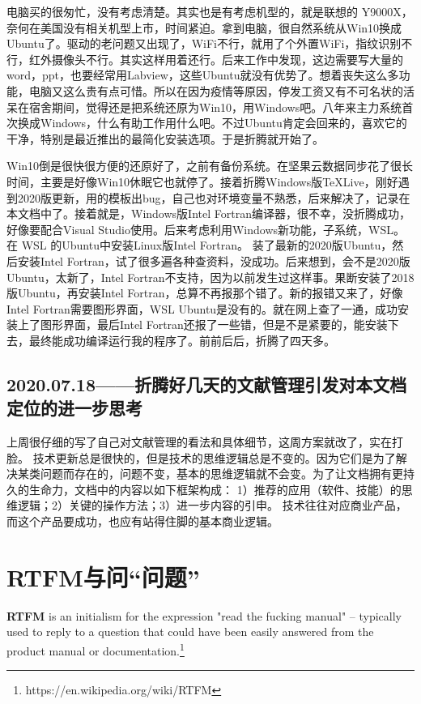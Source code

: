 \documentclass[cn,11pt,chinese,twoside]{elegantbook}
\begin{document}
电脑买的很匆忙，没有考虑清楚。其实也是有考虑机型的，就是联想的 Y9000X，奈何在美国没有相关机型上市，时间紧迫。拿到电脑，很自然系统从Win10换成Ubuntu了。驱动的老问题又出现了，WiFi不行，就用了个外置WiFi，指纹识别不行，红外摄像头不行。其实这样用着还行。后来工作中发现，这边需要写大量的word，ppt，也要经常用Labview，这些Ubuntu就没有优势了。想着丧失这么多功能，电脑又这么贵有点可惜。所以在因为疫情等原因，停发工资又有不可名状的活呆在宿舍期间，觉得还是把系统还原为Win10，用Windows吧。八年来主力系统首次换成Windows，什么有助工作用什么吧。不过Ubuntu肯定会回来的，喜欢它的干净，特别是最近推出的最简化安装选项。于是折腾就开始了。

Win10倒是很快很方便的还原好了，之前有备份系统。在坚果云数据同步花了很长时间，主要是好像Win10休眠它也就停了。接着折腾Windows版\TeX Live，刚好遇到2020版更新，用的模板出bug，自己也对环境变量不熟悉，后来解决了，记录在本文档中了。接着就是，Windows版Intel Fortran编译器，很不幸，没折腾成功，好像要配合Visual Studio使用。后来考虑利用Windows新功能，子系统，WSL。在 WSL 的Ubuntu中安装Linux版Intel Fortran。 装了最新的2020版Ubuntu，然后安装Intel Fortran，试了很多遍各种查资料，没成功。后来想到，会不是2020版Ubuntu，太新了，Intel Fortran不支持，因为以前发生过这样事。果断安装了2018版Ubuntu，再安装Intel Fortran，总算不再报那个错了。新的报错又来了，好像Intel Fortran需要图形界面，WSL Ubuntu是没有的。就在网上查了一通，成功安装上了图形界面，最后Intel Fortran还报了一些错，但是不是紧要的，能安装下去，最终能成功编译运行我的程序了。前前后后，折腾了四天多。




\subsection*{2020.07.18——折腾好几天的文献管理引发对本文档定位的进一步思考}
上周很仔细的写了自己对文献管理的看法和具体细节，这周方案就改了，实在打脸。
技术更新总是很快的，但是技术的思维逻辑总是不变的。因为它们是为了解决某类问题而存在的，问题不变，基本的思维逻辑就不会变。为了让文档拥有更持久的生命力，文档中的内容以如下框架构成：
1）推荐的应用（软件、技能）的思维逻辑；2）关键的操作方法；3）进一步内容的引申。
技术往往对应商业产品，而这个产品要成功，也应有站得住脚的基本商业逻辑。



\section*{RTFM与问“问题”}
\textbf{RTFM} is an initialism for the expression "read the fucking manual" – typically used to reply to a question that could have been easily answered from the product manual or documentation.\footnote{https://en.wikipedia.org/wiki/RTFM}
\end{document}
